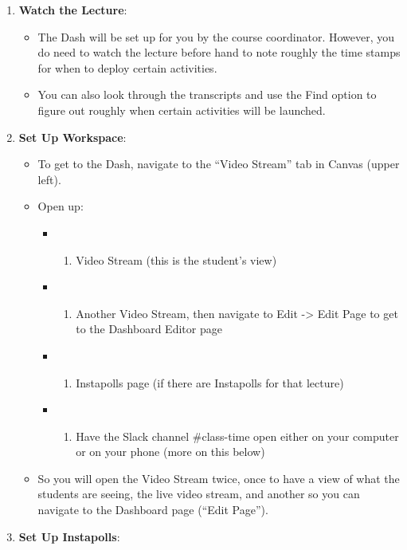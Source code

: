\documentclass[
]{article}
\providecommand{\tightlist}{%
  \setlength{\itemsep}{0pt}\setlength{\parskip}{0pt}}
\begin{document}
\begin{enumerate}
\def\labelenumi{\arabic{enumi}.}
\tightlist
\item
  \textbf{Watch the Lecture}:

  \begin{itemize}
  \tightlist
  \item
    The Dash will be set up for you by the course coordinator. However, you do need to watch the lecture before hand to note roughly the time stamps for when to deploy certain activities.
  \item
    You can also look through the transcripts and use the Find option to figure out roughly when certain activities will be launched.
  \end{itemize}
\item
  \textbf{Set Up Workspace}:

  \begin{itemize}
  \tightlist
  \item
    To get to the Dash, navigate to the ``Video Stream'' tab in Canvas (upper left).
  \item
    Open up:

    \begin{itemize}
    \item
      \begin{enumerate}
      \def\labelenumii{\arabic{enumii})}
      \tightlist
      \item
        Video Stream (this is the student's view)
      \end{enumerate}
    \item
      \begin{enumerate}
      \def\labelenumii{\arabic{enumii})}
      \setcounter{enumii}{1}
      \tightlist
      \item
        Another Video Stream, then navigate to Edit -\textgreater{} Edit Page to get to the Dashboard Editor page\\
      \end{enumerate}
    \item
      \begin{enumerate}
      \def\labelenumii{\arabic{enumii})}
      \setcounter{enumii}{2}
      \tightlist
      \item
        Instapolls page (if there are Instapolls for that lecture)\\
      \end{enumerate}
    \item
      \begin{enumerate}
      \def\labelenumii{\arabic{enumii})}
      \setcounter{enumii}{3}
      \tightlist
      \item
        Have the Slack channel \#class-time open either on your computer or on your phone (more on this below)
      \end{enumerate}
    \end{itemize}
  \item
    So you will open the Video Stream twice, once to have a view of what the students are seeing, the live video stream, and another so you can navigate to the Dashboard page (``Edit Page'').
  \end{itemize}
\item
  \textbf{Set Up Instapolls}:


\end{enumerate}
\end{document}
